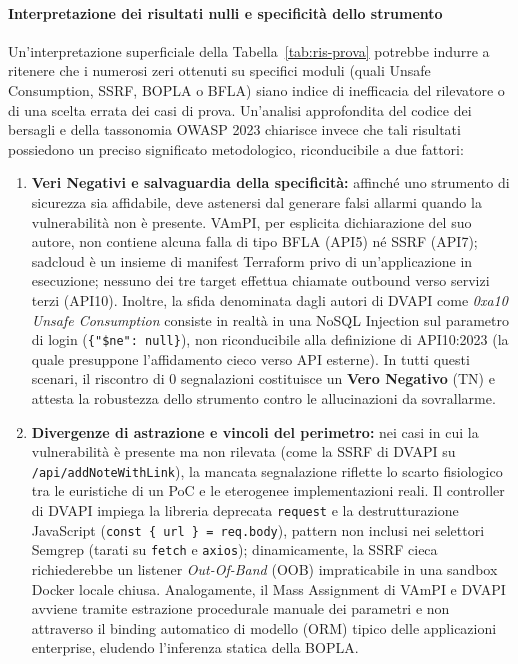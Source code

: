\paragraph{Interpretazione dei risultati nulli e specificità dello strumento}
Un'interpretazione superficiale della Tabella~\ref{tab:ris-prova} potrebbe indurre a ritenere
che i numerosi zeri ottenuti su specifici moduli (quali Unsafe Consumption, SSRF, BOPLA o BFLA)
siano indice di inefficacia del rilevatore o di una scelta errata dei casi di prova. Un'analisi
approfondita del codice dei bersagli e della tassonomia OWASP 2023 chiarisce invece che tali
risultati possiedono un preciso significato metodologico, riconducibile a due fattori:
\begin{enumerate}
  \item \textbf{Veri Negativi e salvaguardia della specificità:} affinché uno strumento di sicurezza
    sia affidabile, deve astenersi dal generare falsi allarmi quando la vulnerabilità non è presente.
    VAmPI, per esplicita dichiarazione del suo autore, non contiene alcuna falla di tipo BFLA (API5)
    né SSRF (API7); sadcloud è un insieme di manifest Terraform privo di un'applicazione in esecuzione;
    nessuno dei tre target effettua chiamate outbound verso servizi terzi (API10). Inoltre, la sfida
    denominata dagli autori di DVAPI come \emph{0xa10 Unsafe Consumption} consiste in realtà in una
    NoSQL Injection sul parametro di login (\texttt{\{"\$ne": null\}}), non riconducibile alla definizione
    di API10:2023 (la quale presuppone l'affidamento cieco verso API esterne). In tutti questi scenari,
    il riscontro di 0 segnalazioni costituisce un \textbf{Vero Negativo} (TN) e attesta la robustezza
    dello strumento contro le allucinazioni da sovrallarme.
  \item \textbf{Divergenze di astrazione e vincoli del perimetro:} nei casi in cui la vulnerabilità è
    presente ma non rilevata (come la SSRF di DVAPI su \texttt{/api/addNoteWithLink}), la mancata
    segnalazione riflette lo scarto fisiologico tra le euristiche di un PoC e le eterogenee implementazioni
    reali. Il controller di DVAPI impiega la libreria deprecata \texttt{request} e la destrutturazione
    JavaScript (\texttt{const \{ url \} = req.body}), pattern non inclusi nei selettori Semgrep (tarati
    su \texttt{fetch} e \texttt{axios}); dinamicamente, la SSRF cieca richiederebbe un listener
    \emph{Out-Of-Band} (OOB) impraticabile in una sandbox Docker locale chiusa. Analogamente, il Mass Assignment
    di VAmPI e DVAPI avviene tramite estrazione procedurale manuale dei parametri e non attraverso il binding
    automatico di modello (ORM) tipico delle applicazioni enterprise, eludendo l'inferenza statica della BOPLA.
\end{enumerate}

